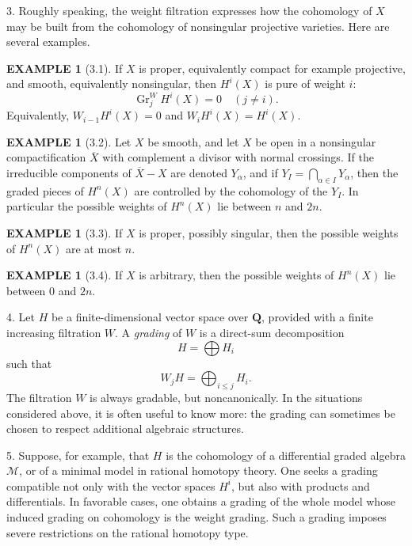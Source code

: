 \documentclass[10pt]{amsart}
\theoremstyle{plain}
\theoremstyle{definition}
\newtheorem{example}[theorem]{EXAMPLE}
\theoremstyle{remark}
\DeclareMathOperator{\Gr}{Gr}
\begin{document}
3. Roughly speaking, the weight filtration expresses how the cohomology of $X$ may be built from the cohomology of nonsingular projective varieties. Here are several examples.

\begin{example}[3.1]
If $X$ is proper, equivalently compact for example projective, and smooth, equivalently nonsingular, then $H^i(X)$ is pure of weight $i$:
\[
\Gr_j^W H^i(X)=0\quad(j\ne i).
\]
Equivalently, $W_{i-1}H^i(X)=0$ and $W_iH^i(X)=H^i(X)$.
\end{example}

\begin{example}[3.2]
Let $X$ be smooth, and let $X$ be open in a nonsingular compactification $\overline X$ with complement a divisor with normal crossings. If the irreducible components of $\overline X-X$ are denoted $Y_\alpha$, and if $Y_I=\bigcap_{\alpha\in I}Y_\alpha$, then the graded pieces of $H^n(X)$ are controlled by the cohomology of the $Y_I$. In particular the possible weights of $H^n(X)$ lie between $n$ and $2n$.
\end{example}

\begin{example}[3.3]
If $X$ is proper, possibly singular, then the possible weights of $H^n(X)$ are at most $n$.
\end{example}

\begin{example}[3.4]
If $X$ is arbitrary, then the possible weights of $H^n(X)$ lie between $0$ and $2n$.
\end{example}

4. Let $H$ be a finite-dimensional vector space over $\mathbf Q$, provided with a finite increasing filtration $W$. A \textit{grading} of $W$ is a direct-sum decomposition
\[
H=\bigoplus H_i
\]
such that
\[
W_jH=\bigoplus_{i\le j}H_i.
\]
The filtration $W$ is always gradable, but noncanonically. In the situations considered above, it is often useful to know more: the grading can sometimes be chosen to respect additional algebraic structures.

5. Suppose, for example, that $H$ is the cohomology of a differential graded algebra $\mathscr M$, or of a minimal model in rational homotopy theory. One seeks a grading compatible not only with the vector spaces $H^i$, but also with products and differentials. In favorable cases, one obtains a grading of the whole model whose induced grading on cohomology is the weight grading. Such a grading imposes severe restrictions on the rational homotopy type.
\end{document}
